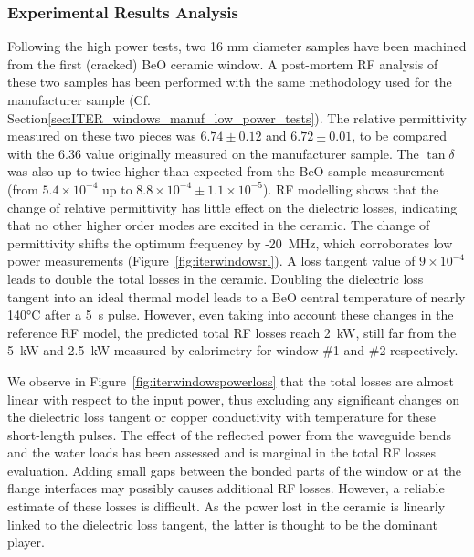 {\subsubsection{Experimental Results Analysis}

Following the high power tests, two 16 mm diameter samples have been machined from the first (cracked) BeO ceramic window. A post-mortem RF analysis of these two samples has been performed with the same methodology used for the manufacturer sample (Cf. Section\ref{sec:ITER_windows_manuf_low_power_tests}). The relative permittivity measured on these two pieces was $6.74\pm0.12$ and $6.72\pm0.01$, to be compared with the 6.36 value originally measured on the manufacturer sample. The $\tan \delta$ was also up to twice higher than expected from the BeO sample measurement (from $5.4\times10^{-4}$ up to $8.8\times10^{-4} \pm 1.1\times 10^{-5}$). RF modelling shows that the change of relative permittivity has little effect on the dielectric losses, indicating that no other higher order modes are excited in the ceramic. The change of permittivity shifts the optimum frequency by -20~MHz, which corroborates low power measurements (Figure~\ref{fig:iterwindowsrl}). A loss tangent value of $9\times10^{-4}$ leads to double the total losses in the ceramic. Doubling the dielectric loss tangent into an ideal thermal model leads to a BeO central temperature of nearly 140$\si{\degreeCelsius}$ after a 5~s pulse. However, even taking into account these changes in the reference RF model, the predicted total RF losses reach 2~kW, still far from the 5~kW and 2.5~kW measured by calorimetry for window \#1 and \#2 respectively. 

We observe in Figure~\ref{fig:iterwindowspowerloss} that the total losses are almost linear with respect to the input power, thus excluding any significant changes on the dielectric loss tangent or copper conductivity with temperature for these short-length pulses.  The effect of the reflected power from the waveguide bends and the water loads has been assessed and is marginal in the total RF losses evaluation. Adding small gaps between the bonded parts of the window or at the flange interfaces may possibly causes additional RF losses. However, a reliable estimate of these losses is difficult. As the power lost in the ceramic is linearly linked to the dielectric loss tangent, the latter is thought to be the dominant player.

}
